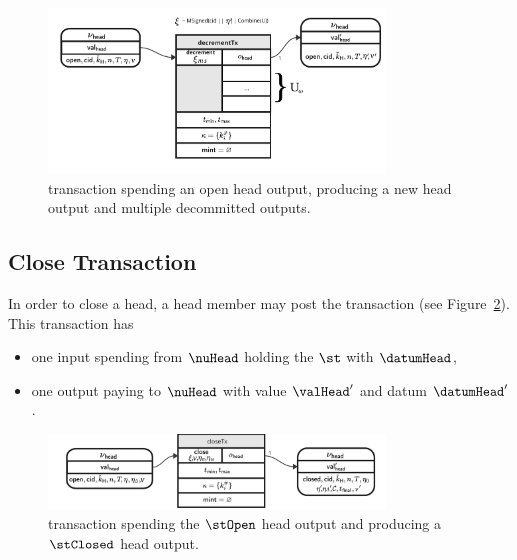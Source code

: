 \begin{figure}
  \centering
  \includegraphics[width=0.8\textwidth]{Hydra/Protocol/Figures/decrementTx.pdf}
  \caption{\mtxDecrement{} transaction spending an open head output,
	producing a new head output and multiple decommitted outputs.}\label{fig:decrementTx}
\end{figure}

\subsection{Close Transaction}\label{sec:close-tx}

In order to close a head, a head member may post the \mtxClose{} transaction
(see Figure~\ref{fig:closeTx}). This transaction has
\begin{itemize}
  \item one input spending from $\nuHead$ holding the $\st$ with $\datumHead$,
  \item one output paying to $\nuHead$ with value $\valHead'$ and
  datum $\datumHead'$.
\end{itemize}

\begin{figure}
  \centering
  \includegraphics[width=0.8\textwidth]{Hydra/Protocol/Figures/closeTx.pdf}
  \caption{\mtxClose{} transaction spending the $\stOpen$ head output and producing a $\stClosed$ head output.}\label{fig:closeTx}
\end{figure}

